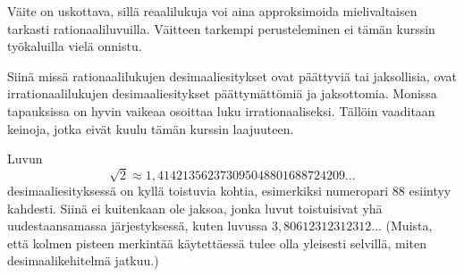 
Väite on uskottava, sillä reaalilukuja voi aina approksimoida mielivaltaisen tarkasti rationaaliluvuilla. Väitteen tarkempi perusteleminen ei tämän kurssin työkaluilla vielä onnistu. %

Siinä missä rationaalilukujen desimaaliesitykset ovat päättyviä tai jaksollisia, ovat irrationaalilukujen desimaaliesitykset päättymättömiä ja jaksottomia. Monissa tapauksissa on hyvin vaikeaa osoittaa luku irrationaaliseksi. Tällöin vaaditaan keinoja, jotka eivät kuulu tämän kurssin laajuuteen.

Luvun
\[\sqrt{2} \approx 1,414213562373095048801688724209\ldots\]
desimaaliesityksessä on kyllä toistuvia kohtia, esimerkiksi numeropari $88$ esiintyy kahdesti. Siinä ei kuitenkaan ole jaksoa, jonka luvut toistuisivat yhä uudestaansamassa järjestyksessä, kuten luvussa $3,80612312312312\ldots$ (Muista, että kolmen pisteen merkintää käytettäessä tulee olla yleisesti selvillä, miten desimaalikehitelmä jatkuu.)